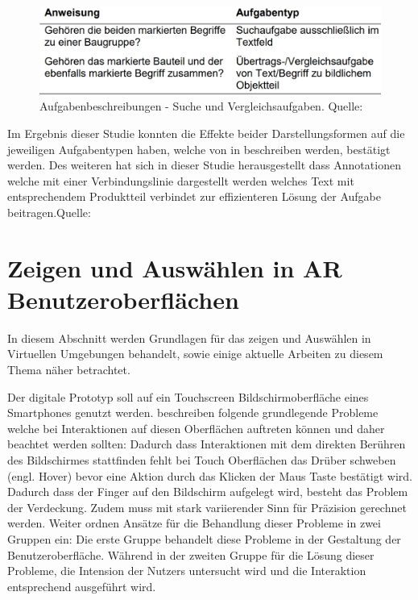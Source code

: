 \begin{figure}[H]
	\centering 
	\includegraphics[width=.6\textwidth]{resources/analyse/brandenburg_aufgabentypen.png}
	\caption{Aufgabenbeschreibungen - Suche und Vergleichsaufgaben. Quelle: \cite[S.~132]{Brandenburg2019}}
	\label{img:aufgabenbeschreibung}
\end{figure}

Im Ergebnis dieser Studie konnten die Effekte beider Darstellungsformen auf die jeweiligen Aufgabentypen haben, welche von \citeauthor{Polys2007} in \cite{Polys2007} beschreiben werden, bestätigt werden.
Des weiteren hat sich in dieser Studie herausgestellt dass Annotationen welche mit einer Verbindungslinie dargestellt werden welches Text mit entsprechendem Produktteil verbindet 
zur effizienteren Lösung der Aufgabe beitragen.Quelle: \cite[S.~135]{Brandenburg2019}

\section{Zeigen und Auswählen in AR Benutzeroberflächen} \label{pointer_section}

In diesem Abschnitt werden Grundlagen für das zeigen und Auswählen in Virtuellen Umgebungen behandelt, sowie einige aktuelle Arbeiten 
zu diesem Thema näher betrachtet. 

Der digitale Prototyp soll auf ein Touchscreen Bildschirmoberfläche eines Smartphones genutzt werden.
\citeauthor{Ortega2016} beschreiben folgende grundlegende Probleme welche bei Interaktionen auf diesen Oberflächen auftreten können und daher beachtet werden sollten:  
Dadurch dass Interaktionen mit dem direkten Berühren des Bildschirmes stattfinden fehlt bei Touch Oberflächen das Drüber schweben (engl. Hover) bevor eine Aktion durch das Klicken der Maus Taste bestätigt wird. 
Dadurch dass der Finger auf den Bildschirm aufgelegt wird, besteht das Problem der Verdeckung. Zudem muss mit stark variierender Sinn für Präzision gerechnet werden. Weiter ordnen \cite[S.~205]{Ortega2016} Ansätze 
für die Behandlung dieser Probleme in zwei Gruppen ein: Die erste Gruppe behandelt diese Probleme in der Gestaltung der Benutzeroberfläche. Während in der zweiten Gruppe für die Lösung dieser Probleme, die Intension 
der Nutzers untersucht wird und die Interaktion entsprechend ausgeführt wird. \cite[S.~205]{Ortega2016}

